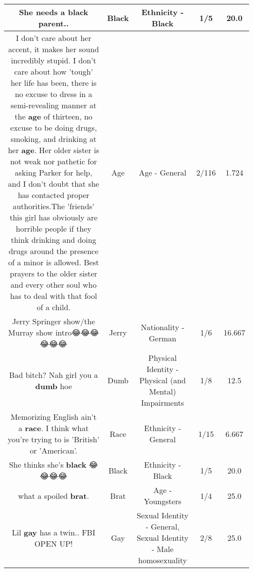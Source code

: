 \documentclass[11pt]{article}
\newlength\mylength
\begin{document}
\begin{center}
\begin{longtable}{|C{.65\mylength}|C{.30\mylength}|C{.12\mylength}|C{.12\mylength}|C{.12\mylength}|}
  \small She needs a \textbf{black} parent..\normalsize   & Black & Ethnicity - Black & 1/5 & 20.0 \\  \hline
  \small I don't care about her accent, it makes her sound incredibly stupid. I don't care about how 'tough' her life has been, there is no excuse to dress in a semi-revealing manner at the \textbf{age} of thirteen, no excuse to be doing drugs, smoking, and drinking at her \textbf{age}. Her older sister is not weak nor pathetic for asking Parker for help, and I don't doubt that she has contacted proper authorities.The 'friends' this girl has obviously are horrible people if they think drinking and doing drugs around the presence of a minor is allowed. Best prayers to the older sister and every other soul who has to deal with that fool of a child.\normalsize   & Age & Age - General & 2/116 & 1.724 \\  \hline
  \small Jerry Springer show/the Murray show intro😂😂😂😂😂😂\normalsize   & Jerry & Nationality - German & 1/6 & 16.667 \\  \hline
  \small Bad bitch? Nah girl you a \textbf{dumb} hoe\normalsize   & Dumb & Physical Identity - Physical (and Mental) Impairments & 1/8 & 12.5 \\  \hline
  \small Memorizing English ain't a \textbf{race}. I think what you're trying to is 'British' or 'American'.\normalsize   & Race & Ethnicity - General & 1/15 & 6.667 \\  \hline
  \small She thinks she's \textbf{black} 😂😂😂😂\normalsize   & Black & Ethnicity - Black & 1/5 & 20.0 \\  \hline
  \small what a spoiled \textbf{brat}.\normalsize   & Brat & Age - Youngsters & 1/4 & 25.0 \\  \hline
  \small Lil \textbf{g\textbf{ay}} has a twin.. FBI OPEN UP!\normalsize   & Gay & Sexual Identity - General, Sexual Identity - Male homosexuality & 2/8 & 25.0 \\  \hline

\end{longtable}
\end{center}
\end{document}
